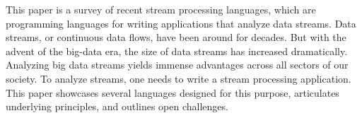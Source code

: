 This paper is a survey of recent stream processing languages, which
are programming languages for writing applications that analyze data
streams. Data streams, or continuous data flows, have been around for
decades. But with the advent of the big-data era, the size of data
streams has increased dramatically. Analyzing big data streams yields
immense advantages across all sectors of our society. To analyze
streams, one needs to write a stream processing application. This
paper showcases several languages designed for this purpose,
articulates underlying principles, and outlines open challenges.
